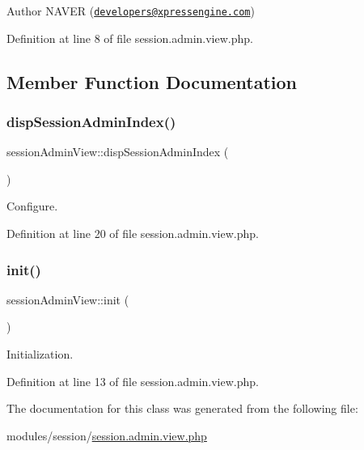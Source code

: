 \begin{DoxyAuthor}{Author}
N\+A\+V\+ER (\href{mailto:developers@xpressengine.com}{\tt developers@xpressengine.\+com}) 
\end{DoxyAuthor}


Definition at line 8 of file session.\+admin.\+view.\+php.



\subsection{Member Function Documentation}
\hypertarget{classsessionAdminView_af76bbb38a12a68e4ab36fa67c0b1fe06}{}\label{classsessionAdminView_af76bbb38a12a68e4ab36fa67c0b1fe06} 
\subsubsection{\texorpdfstring{disp\+Session\+Admin\+Index()}{dispSessionAdminIndex()}}
{\footnotesize\ttfamily session\+Admin\+View\+::disp\+Session\+Admin\+Index (\begin{DoxyParamCaption}{ }\end{DoxyParamCaption})}



Configure. 



Definition at line 20 of file session.\+admin.\+view.\+php.

\hypertarget{classsessionAdminView_af890ef145e5fa8e0d092ab204ef104d6}{}\label{classsessionAdminView_af890ef145e5fa8e0d092ab204ef104d6} 
\subsubsection{\texorpdfstring{init()}{init()}}
{\footnotesize\ttfamily session\+Admin\+View\+::init (\begin{DoxyParamCaption}{ }\end{DoxyParamCaption})}



Initialization. 



Definition at line 13 of file session.\+admin.\+view.\+php.



The documentation for this class was generated from the following file\+:\begin{DoxyCompactItemize}
\item 
modules/session/\hyperlink{session_8admin_8view_8php}{session.\+admin.\+view.\+php}\end{DoxyCompactItemize}
